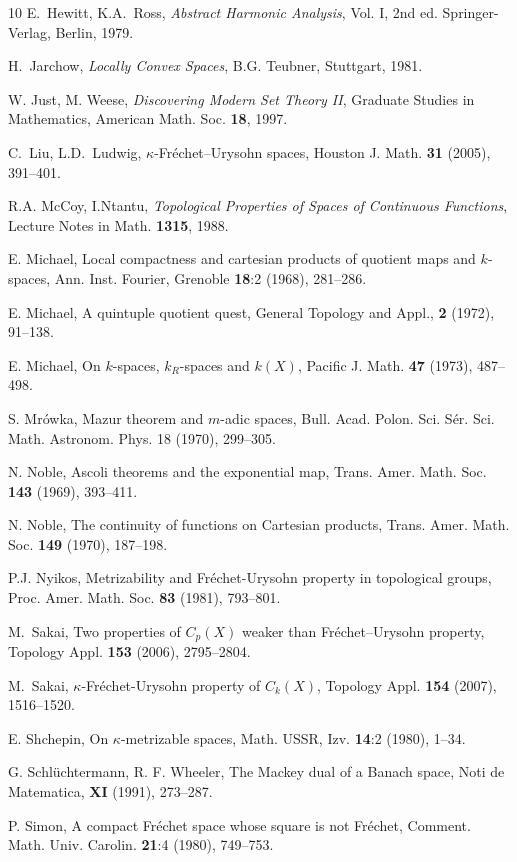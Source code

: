 \documentclass[preprint,11pt]{elsarticle}
\numberwithin{equation}{section}
\numberwithin{theorem}{section}
\newcommand{\CC}{C_k}
\begin{document}
\begin{thebibliography}{10}
E.~Hewitt, K.A.~Ross,  \emph{Abstract Harmonic Analysis}, Vol. I, 2nd ed. Springer-Verlag, Berlin, 1979.


H.~Jarchow, \emph{Locally Convex Spaces}, B.G. Teubner, Stuttgart, 1981.

W. Just, M. Weese, {\em Discovering Modern Set Theory II}, Graduate Studies in Mathematics, American Math. Soc.  \textbf{18}, 1997.

C.~Liu, L.D.~Ludwig, $\kappa$-Fr\'{e}chet--Urysohn spaces, Houston J. Math. \textbf{31} (2005), 391--401.

R.A. McCoy, I.Ntantu, \emph{Topological Properties of Spaces of Continuous Functions}, Lecture Notes in Math.  \textbf{1315}, 1988.

E. Michael, Local compactness and cartesian products of quotient maps and $k$-spaces, Ann. Inst. Fourier, Grenoble \textbf{18}:2 (1968), 281--286.

E. Michael, A quintuple quotient quest, General Topology and Appl., \textbf{2} (1972), 91--138.

E. Michael, On $k$-spaces, $k_R$-spaces and $k(X)$, Pacific J. Math. \textbf{47}  (1973), 487--498.

S. Mr\'{o}wka, Mazur theorem and $m$-adic spaces, Bull. Acad. Polon. Sci. S\'{e}r. Sci. Math. Astronom. Phys. 18 (1970), 299--305.

N. Noble, Ascoli theorems and the exponential map, Trans. Amer. Math. Soc. \textbf{143}  (1969), 393--411.

N. Noble,  The continuity of functions on Cartesian products, Trans. Amer. Math. Soc. \textbf{149}  (1970), 187--198.


P.J. Nyikos, Metrizability and Fr\'{e}chet-Urysohn property in topological groups, Proc. Amer. Math. Soc. \textbf{83} (1981), 793--801.



M.~Sakai, Two properties of $C_p(X)$ weaker than Fr\'{e}chet--Urysohn property, Topology Appl. \textbf{153} (2006), 2795--2804.

M.~Sakai, $\kappa$-Fr\'{e}chet-Urysohn property of $\CC(X)$, Topology Appl. \textbf{154} (2007), 1516--1520.

E. Shchepin, On $\kappa$-metrizable spaces, Math. USSR, Izv. \textbf{14}:2 (1980), 1--34.

G. Schl\"{u}chtermann, R. F. Wheeler, The Mackey dual of a Banach space, Noti de Matematica, \textbf{XI} (1991), 273--287.

P. Simon, A compact Fr\'{e}chet space whose square is not Fr\'{e}chet, Comment. Math. Univ. Carolin. \textbf{21}:4 (1980), 749--753.

\end{thebibliography}
\end{document}
